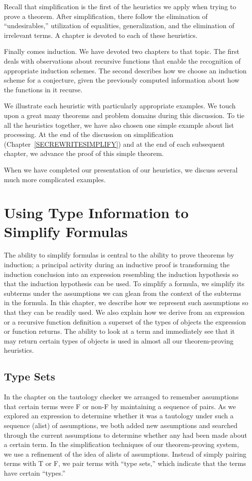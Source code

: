 \documentclass[10pt]{book}
\begin{document}
Recall that simplification is the first
of the heuristics
we apply when trying to prove a theorem.  After simplification, there follow the elimination
of ``undesirables,'' utilization of equalities, generalization, and the elimination
of irrelevant terms.  A chapter is devoted to each of
these heuristics.

Finally comes induction.  We have devoted two chapters
to that topic.  The first deals with observations about recursive functions
that enable the recognition of appropriate induction schemes.
The second
describes how we choose
an induction scheme for a conjecture, given the previously computed information
about how the functions in it recurse.

We illustrate each heuristic with particularly appropriate examples.
We touch upon a great many theorems and problem domains
during this discussion.  To tie all the heuristics together, we have also
chosen one simple example about list processing.
At the end of the discussion on simplification (Chapter~\ref{SECREWRITESIMPLIFY}) and 
at the end of each subsequent chapter, we  advance the
proof of this simple theorem.

When we have completed our presentation of our heuristics, we 
discuss several much more complicated examples.

\chapter{Using Type Information to Simplify Formulas}
\pagestyle{headings}
\label{SECTYPESET}
The ability to simplify formulas is central to the
ability to prove theorems by induction; a
principal activity during an inductive proof is transforming the
induction conclusion into an expression resembling the induction
hypothesis so that the induction hypothesis can be used.
To simplify a formula, we simplify its subterms
under the  assumptions we can glean from the context of
the subterms in the formula.  In this chapter, we
describe how we represent such assumptions so that they
can be readily used.
We also explain how we derive from an expression or a
recursive function definition a superset of the types of
objects the expression or function returns.  The ability to look
at a term and immediately see that it may return certain
types of objects is used in almost all our theorem-proving
heuristics.

\section{Type Sets}
In the chapter on the tautology checker
we arranged to remember assumptions that certain terms
were F or non-F by maintaining a sequence of pairs.  As we explored
an expression to determine whether it was a tautology under such
a sequence (alist) of assumptions,
we both added new assumptions and searched through the
current assumptions  to determine whether any 
had been made about a certain term.  In the  simplification
techniques of our theorem-proving system,
we use a refinement of the idea of alists of assumptions.
Instead of simply pairing terms with 
T or F, we pair terms with ``type sets,''	
which indicate that the terms have certain ``types.''
\end{document}

